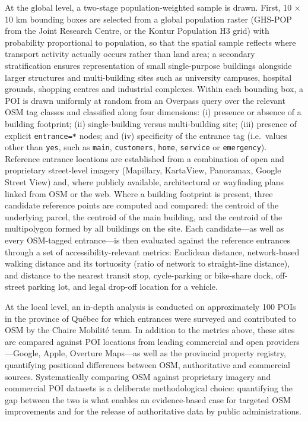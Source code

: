 \documentclass{article}
\begin{document}
At the global level, a two-stage population-weighted sample is drawn.
First, 10 × 10 km bounding boxes are selected from a global population
raster (GHS-POP from the Joint Research Centre, or the Kontur
Population H3 grid) with probability proportional to
population, so that the spatial sample reflects where transport
activity actually occurs rather than land area; a secondary
stratification ensures representation of small single-purpose
buildings alongside larger structures and multi-building sites such as
university campuses, hospital grounds, shopping centres and industrial
complexes. Within each bounding box, a POI is drawn uniformly at
random from an Overpass query over the relevant OSM tag classes and
classified along four dimensions: (i) presence or absence of a building footprint; (ii)
single-building versus multi-building site; (iii) presence of explicit
\texttt{entrance=*} nodes; and (iv) specificity of the entrance tag
(i.e.\ values other than \texttt{yes}, such as \texttt{main},
\texttt{customers}, \texttt{home}, \texttt{service} or
\texttt{emergency}). Reference entrance locations are established
from a combination of open and proprietary street-level imagery
(Mapillary, KartaView, Panoramax, Google Street View) and, where
publicly available, architectural or wayfinding plans linked from OSM
or the web. Where a building
footprint is present, three candidate reference points are computed
and compared: the centroid of the underlying parcel, the centroid of
the main building, and the centroid of the multipolygon formed by all
buildings on the site. Each candidate---as well as every
OSM-tagged entrance---is then evaluated against the reference
entrances through a set of accessibility-relevant metrics: Euclidean
distance, network-based walking distance and its tortuosity (ratio of
network to straight-line distance), and distance to the nearest
transit stop, cycle-parking or bike-share dock, off-street parking
lot, and legal drop-off location for a vehicle.

At the local level, an in-depth analysis is conducted on approximately
100 POIs in the province of Québec for which entrances were surveyed
and contributed to OSM by the Chaire Mobilité team. In addition to
the metrics above, these sites are compared against POI locations
from leading commercial and open providers---Google, Apple,
Overture Maps---as well as the provincial property registry,
quantifying positional differences between
OSM, authoritative and commercial sources. Systematically comparing
OSM against proprietary imagery and commercial POI datasets is a
deliberate methodological choice: quantifying the gap between the two
is what enables an evidence-based case for targeted OSM improvements
and for the release of authoritative data by public administrations.
\end{document}
